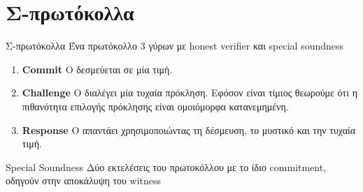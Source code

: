 \documentclass[handout]{beamer}
\begin{document}
\section{Σ-πρωτόκολλα}

\begin{frame}{Σ-πρωτόκολλα}
Ένα πρωτόκολλο 3 γύρων με honest verifier και special soundness
\begin{enumerate}
	\item \textbf{Commit} O \prv δεσμεύεται σε μία τιμή.
	\item \textbf{Challenge} Ο \ver διαλέγει μία τυχαία πρόκληση. Εφόσον είναι τίμιος θεωρούμε ότι η πιθανότητα επιλογής πρόκλησης είναι ομοιόμορφα κατανεμημένη.
	\item \textbf{Response} O \prv απαντάει χρησιμοποιώντας τη δέσμευση, το μυστικό και την τυχαία τιμή. 
\end{enumerate}

\begin{block}{Special Soundness}
Δύο εκτελέσεις του πρωτοκόλλου με το ίδιο commitment, οδηγούν στην αποκάλυψη του witness
\end{block}
\end{frame}
\end{document}
